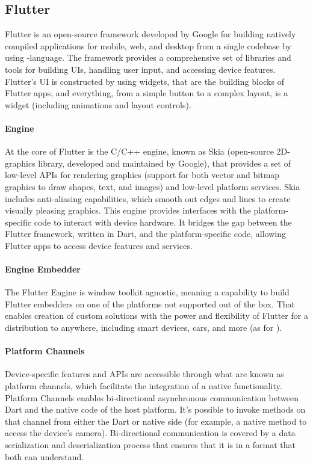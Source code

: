 
\subsection{Flutter}

Flutter is an open-source framework developed by Google for building natively compiled applications for mobile, web, and 
desktop from a single codebase by using -language. The framework provides a comprehensive set of libraries and 
tools for building UIs, handling user input, and accessing device features. Flutter's UI is constructed by using widgets, 
that are the building blocks of Flutter apps, and everything, from a simple button to a complex layout, is a widget
(including animations and layout controls).

\paragraph{Engine} At the core of Flutter is the C/C++ engine, known as Skia (open-source 2D-graphics library, developed 
and maintained by Google), that provides a set of low-level APIs for rendering graphics (support for both vector and 
bitmap graphics to draw shapes, text, and images) and low-level platform services. Skia includes anti-aliasing 
capabilities, which smooth out edges and lines to create visually pleasing graphics. This engine provides interfaces 
with the platform-specific code to interact with device hardware. It bridges the gap between the Flutter framework, 
written in Dart, and the platform-specific code, allowing Flutter apps to access device features and services.

\paragraph{Engine Embedder}

The Flutter Engine is window toolkit agnostic, meaning a capability to build Flutter embedders on one of the platforms 
not supported out of the box. That enables creation of custom solutions with the power and flexibility of Flutter for 
a distribution to anywhere, including smart devices, cars, and more (as  for ).

\paragraph{Platform Channels} Device-specific features and APIs are accessible through what are known as platform channels, 
which facilitate the integration of a native functionality. Platform Channels enables bi-directional asynchronous 
communication between Dart and the native code of the host platform. It's possible to invoke methods on that channel 
from either the Dart or native side (for example, a native method to access the device's camera). Bi-directional 
communication is covered by a data serialization and deserialization process that ensures that it is in a format that 
both can understand.

